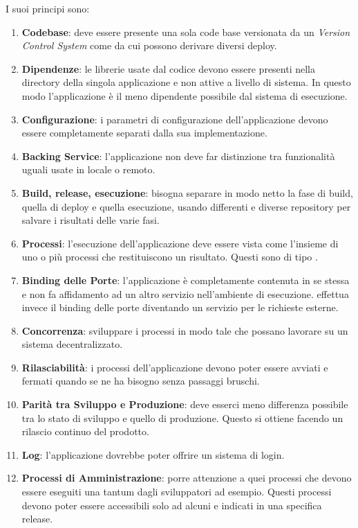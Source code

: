 I suoi principi sono:

\begin{enumerate}
	\item \textbf{Codebase}: deve essere presente una sola code base versionata da un \textit{Version Control System} come  da cui possono derivare diversi deploy.
	\item \textbf{Dipendenze}: le librerie usate dal codice devono essere presenti nella directory della singola applicazione e non attive a livello di sistema. In questo modo l'applicazione è il meno dipendente possibile dal sistema di esecuzione.
	\item \textbf{Configurazione}: i parametri di configurazione dell'applicazione devono essere completamente separati dalla sua implementazione.
	\item \textbf{Backing Service}: l'applicazione non deve far distinzione tra funzionalità uguali usate in locale o remoto.
	\item \textbf{Build, release, esecuzione}: bisogna separare in modo netto la fase di build, quella di deploy e quella esecuzione, usando  differenti e diverse repository per salvare i risultati delle varie fasi.
	\item \textbf{Processi}: l'esecuzione dell'applicazione deve essere vista come l'insieme di uno o più processi che restituiscono un risultato. Questi sono di tipo .
	\item \textbf{Binding delle Porte}: l'applicazione è completamente contenuta in se stessa e non fa affidamento ad un altro servizio nell'ambiente di esecuzione. effettua invece il binding delle porte diventando un servizio per le richieste esterne.
	\item \textbf{Concorrenza}: sviluppare i processi in modo tale che possano lavorare su un sistema decentralizzato.
	\item \textbf{Rilasciabilità}: i processi dell'applicazione devono poter essere avviati e fermati quando se ne ha bisogno senza passaggi bruschi.
	\item \textbf{Parità tra Sviluppo e Produzione}: deve esserci meno differenza possibile tra lo stato di sviluppo e quello di produzione. Questo si ottiene facendo un rilascio continuo del prodotto.
	\item \textbf{Log}: l'applicazione dovrebbe poter offrire un sistema di login.
	\item \textbf{Processi di Amministrazione}: porre attenzione a quei processi che devono essere eseguiti una tantum dagli sviluppatori ad esempio. Questi processi devono poter essere accessibili solo ad alcuni e indicati in una specifica release.
\end{enumerate}

